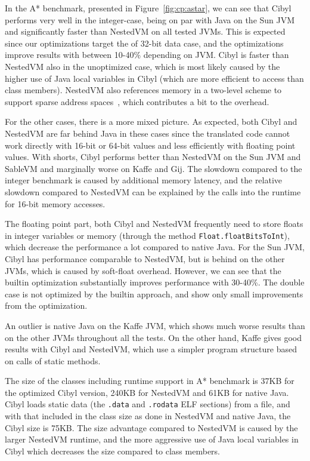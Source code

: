 In the A* benchmark, presented in Figure~\ref{fig:cp:astar}, we can see that
Cibyl performs very well in the integer-case, being on par with Java on the
Sun JVM and significantly faster than NestedVM on all tested JVMs. This is
expected since our optimizations target the of 32-bit data case, and the
optimizations improve results with between 10-40\% depending on JVM.  Cibyl is
faster than NestedVM also in the unoptimized case, which is most likely caused
by the higher use of Java local variables in Cibyl (which are more efficient
to access than class members). NestedVM also references memory in a two-level
scheme to support sparse address spaces~\cite{alliet04nestedvm}, which
contributes a bit to the overhead.
\FloatBarrier

For the other cases, there is a more mixed picture. As expected, both Cibyl
and NestedVM are far behind Java in these cases since the translated code
cannot work directly with 16-bit or 64-bit values and less efficiently with
floating point values. With shorts, Cibyl performs better than NestedVM on the
Sun JVM and SableVM and marginally worse on Kaffe and Gij. The slowdown
compared to the integer benchmark is caused by additional memory latency, and
the relative slowdown compared to NestedVM can be explained by the calls into
the runtime for 16-bit memory accesses.

The floating point part, both Cibyl and NestedVM frequently need to store
floats in integer variables or memory (through the method
\texttt{Float.\-floatBitsToInt}), which decrease the performance a lot compared
to native Java. For the Sun JVM, Cibyl has performance comparable to NestedVM,
but is behind on the other JVMs, which is caused by soft-float overhead.
However, we can see that the builtin optimization substantially improves
performance with 30-40\%. The double case is not optimized by the builtin
approach, and show only small improvements from the optimization.

An outlier is native Java on the Kaffe JVM, which shows much worse results
than on the other JVMs throughout all the tests. On the other hand, Kaffe
gives good results with Cibyl and NestedVM, which use a simpler program
structure based on calls of static methods.

The size of the classes including runtime support in A* benchmark is 37KB for
the optimized Cibyl version, 240KB for NestedVM and 61KB for native Java.
Cibyl loads static data (the \texttt{.data} and \texttt{.rodata} ELF sections)
from a file, and with that included in the class size as done in NestedVM and
native Java, the Cibyl size is 75KB. The size advantage compared to NestedVM
is caused by the larger NestedVM runtime, and the more aggressive use of Java
local variables in Cibyl which decreases the size compared to class members.


